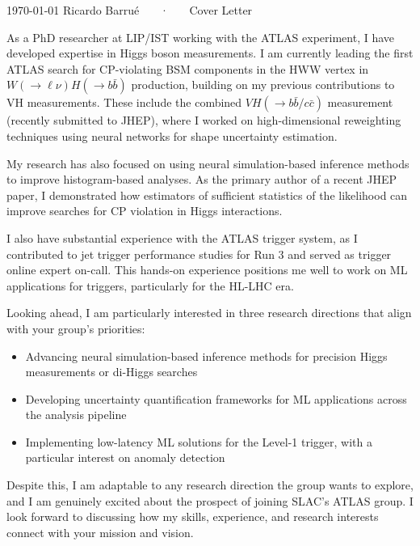 \documentclass[11pt, a4paper]{awesome-cv}
\begin{document}
\makecvheader[R]

\makecvfooter
  {\today}
  {Ricardo Barrué ~~~·~~~ Cover Letter}
  {}

\makelettertitle

\begin{cvletter}

  As a PhD researcher at LIP/IST working with the ATLAS experiment, I have developed expertise in Higgs boson measurements. I am currently leading the first ATLAS search for CP-violating BSM components in the HWW vertex in $W(\to \ell \nu)H(\to b\bar{b})$ production, building on my previous contributions to VH measurements. These include the combined $VH(\to b\bar{b}/c\bar{c})$ measurement (recently submitted to JHEP), where I worked on high-dimensional reweighting techniques using neural networks for shape uncertainty estimation.

  My research has also focused on using neural simulation-based inference methods to improve histogram-based analyses. As the primary author of a recent JHEP paper, I demonstrated how estimators of sufficient statistics of the likelihood can improve searches for CP violation in Higgs interactions.
  
  I also have substantial experience with the ATLAS trigger system, as I contributed to jet trigger performance studies for Run 3 and served as trigger online expert on-call. This hands-on experience positions me well to work on ML applications for triggers, particularly for the HL-LHC era.
  
  Looking ahead, I am particularly interested in three research directions that align with your group's priorities:
  \begin{itemize}
    \item Advancing neural simulation-based inference methods for precision Higgs measurements or di-Higgs searches
    \item Developing uncertainty quantification frameworks for ML applications across the analysis pipeline
    \item Implementing low-latency ML solutions for the Level-1 trigger, with a particular interest on anomaly detection
  \end{itemize}
  
  Despite this, I am adaptable to any research direction the group wants to explore, and I am genuinely excited about the prospect of joining SLAC's ATLAS group. I look forward to discussing how my skills, experience, and research interests connect with your mission and vision.

\end{cvletter}


\makeletterclosing
\end{document}
